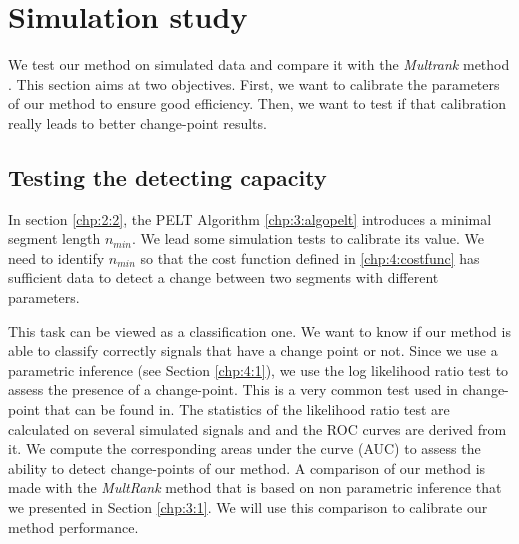 

\section{Simulation study}\label{chp:4:4}

We test our method on simulated data and compare it with the \textit{Multrank} method \cite{lung2015}. This section aims at two objectives. First, we want to calibrate the parameters of our method to ensure good efficiency. Then, we want to test if that calibration really leads to better change-point results.  

\subsection{Testing the detecting capacity}

In section \ref{chp:2:2}, the PELT Algorithm \ref{chp:3:algopelt} introduces a minimal segment length $n_{min}$. We lead some simulation tests to calibrate its value. We need to identify $n_{min}$ so that the cost function defined in \ref{chp:4:costfunc} has sufficient data to detect a change between two segments with different parameters.

This task can be viewed as a classification one. We want to know if our method is able to classify correctly signals that have a change point or not. Since we use a parametric inference (see Section \ref{chp:4:1}), we use the log likelihood ratio test to assess the presence of a change-point. This is a very common test used in change-point that can be found in. The statistics of the likelihood ratio test are calculated on several simulated signals and and the ROC curves \citep{Fawcett2006} are derived from it. We compute the corresponding areas under the curve (AUC) to assess the ability to detect change-points of our method. A comparison of our method is made with the \textit{MultRank} method that is based on non parametric inference that we presented in Section \ref{chp:3:1}. We will use this comparison to calibrate our method performance.  

